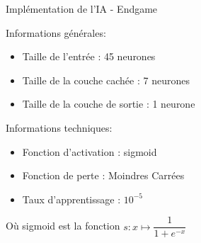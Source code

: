 \documentclass{beamer}
\begin{document}
\begin{frame}{Implémentation de l'IA - Endgame}
    \begin{block}{Informations générales:}
        \begin{itemize}
        \item Taille de l'entrée : 45 neurones
        \item Taille de la couche cachée : 7 neurones
        \item Taille de la couche de sortie : 1 neurone
    \end{itemize}
    \end{block}
    \begin{block}{Informations techniques:}
        \begin{itemize}
        \item Fonction d'activation : sigmoid
        \item Fonction de perte : Moindres Carrées
        \item Taux d'apprentissage : $10^{-5}$
    \end{itemize}
    \end{block}
    Où sigmoid est la fonction $s:x\mapsto \dfrac{1}{1+e^{-x}}$
\end{frame}
\end{document}
